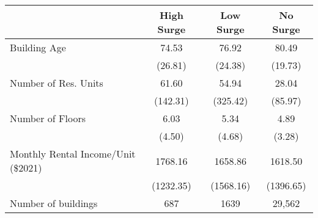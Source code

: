 \begin{tabular}{l*{3}{c}}
\toprule
                &High Surge&Low Surge& No Surge\\
\midrule
Building Age   &    74.53&    76.92&    80.49\\
                &  (26.81)&  (24.38)&  (19.73)\\
\addlinespace
Number of Res. Units        &    61.60&    54.94&    28.04\\
                & (142.31)& (325.42)&  (85.97)\\
\addlinespace
Number of Floors       &     6.03&     5.34&     4.89\\
                &   (4.50)&   (4.68)&   (3.28)\\
\addlinespace
Monthly Rental Income/Unit (\$2021) &  1768.16&  1658.86&  1618.50\\
                &(1232.35)&(1568.16)&(1396.65)\\
\midrule
  Number of buildings              &   687&  1639& 29,562\\
\bottomrule
\end{tabular}
